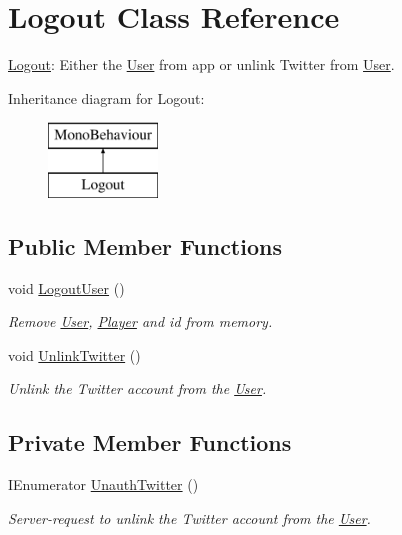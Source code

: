 \hypertarget{class_logout}{}\section{Logout Class Reference}
\label{class_logout}


\mbox{\hyperlink{class_logout}{Logout}}\+: Either the \mbox{\hyperlink{class_user}{User}} from app or unlink Twitter from \mbox{\hyperlink{class_user}{User}}.  


Inheritance diagram for Logout\+:\begin{figure}[H]
\begin{center}
\leavevmode
\includegraphics[height=2.000000cm]{class_logout}
\end{center}
\end{figure}
\subsection*{Public Member Functions}
\begin{DoxyCompactItemize}
\item 
void \mbox{\hyperlink{class_logout_ad1bedba9ab92ee90679b995dfcc168cf}{Logout\+User}} ()
\begin{DoxyCompactList}\small\item\em Remove \mbox{\hyperlink{class_user}{User}}, \mbox{\hyperlink{class_player}{Player}} and id from memory. \end{DoxyCompactList}\item 
void \mbox{\hyperlink{class_logout_af1a3466e449f3a3d69ab1063051902c7}{Unlink\+Twitter}} ()
\begin{DoxyCompactList}\small\item\em Unlink the Twitter account from the \mbox{\hyperlink{class_user}{User}}. \end{DoxyCompactList}\end{DoxyCompactItemize}
\subsection*{Private Member Functions}
\begin{DoxyCompactItemize}
\item 
I\+Enumerator \mbox{\hyperlink{class_logout_acab0eb6e5b954777d300611cb247c117}{Unauth\+Twitter}} ()
\begin{DoxyCompactList}\small\item\em Server-\/request to unlink the Twitter account from the \mbox{\hyperlink{class_user}{User}}. \end{DoxyCompactList}\end{DoxyCompactItemize}


